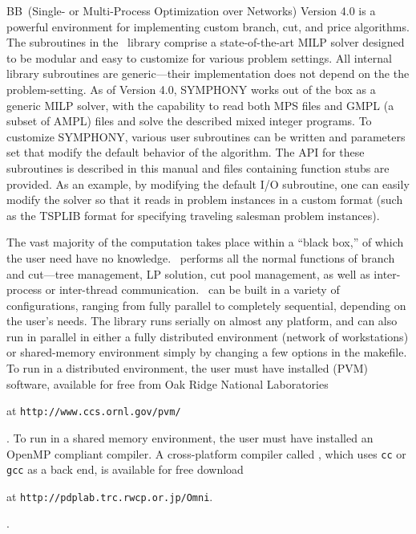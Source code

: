 BB\ (Single- or Multi-Process Optimization over Networks) Version 4.0 is a
powerful environment for implementing custom branch, cut, and price
algorithms. The subroutines in the \BB\ library comprise a state-of-the-art
MILP solver designed to be modular and easy to customize for various problem
settings. All internal library subroutines are generic---their implementation
does not depend on the the problem-setting. As of Version 4.0, SYMPHONY works
out of the box as a generic MILP solver, with the capability to read both MPS
files and GMPL (a subset of AMPL) files and solve the described mixed integer
programs. To customize SYMPHONY, various user subroutines can be written and
parameters set that modify the default behavior of the algorithm. The API for
these subroutines is described in this manual and files containing function
stubs are provided. As an example, by modifying the default I/O subroutine,
one can easily modify the solver so that it reads in problem instances in a
custom format (such as the TSPLIB format for specifying traveling salesman
problem instances).

The vast majority of the computation takes place within a ``black box,'' of
which the user need have no knowledge. \BB\ performs all the normal functions
of branch and cut---tree management, LP solution, cut pool management, as well
as inter-process or inter-thread communication. \BB\ can be built in a variety
of configurations, ranging from fully parallel to completely sequential,
depending on the user's needs. The library runs serially on almost any
platform, and can also run in parallel in either a fully distributed
environment (network of workstations) or shared-memory environment simply by
changing a few options in the makefile. To run in a distributed environment,
the user must have installed {\em
{}}
(PVM) software, available for free from Oak Ridge National Laboratories
\begin{latexonly}
at {\tt http://www.ccs.ornl.gov/pvm/} 
\end{latexonly}. 
To run in a shared memory environment, the user must have installed an
OpenMP compliant compiler. A cross-platform compiler called {\em
{}}, which uses 
{\tt cc} or {\tt gcc} as a back end, is available for free download
\begin{latexonly}
at {\tt http://pdplab.trc.rwcp.or.jp/Omni}.
\end{latexonly}.

